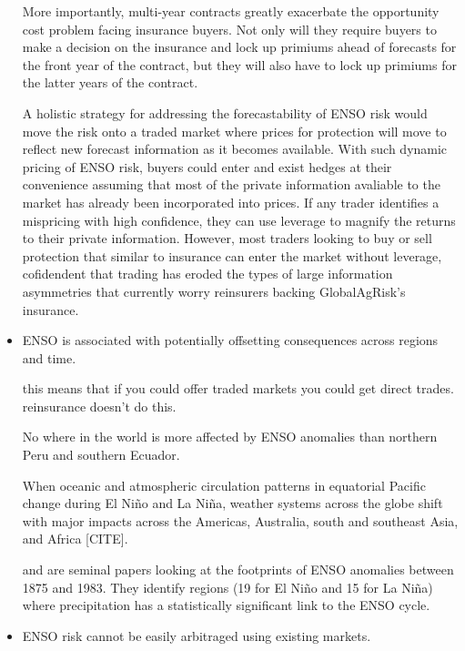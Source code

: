 \documentclass[authoryear]{article}
\begin{document}
\begin{itemize}
More importantly, multi-year contracts greatly exacerbate the opportunity cost problem facing insurance buyers. Not only will they require buyers to make a decision on the insurance and lock up primiums ahead of forecasts for the front year of the contract, but they will also have to lock up primiums for the latter years of the contract.

A holistic strategy for addressing the forecastability of ENSO risk would move the risk onto a traded market where prices for protection will move to reflect new forecast information as it becomes available. With such dynamic pricing of ENSO risk, buyers could enter and exist hedges at their convenience assuming that most of the private information avaliable to the market has already been incorporated into prices. If any trader identifies a mispricing with high confidence, they can use leverage to magnify the returns to their private information. However, most traders looking to buy or sell protection that similar to insurance can enter the market without leverage, cofidendent that trading has eroded the types of large information asymmetries that currently worry reinsurers backing GlobalAgRisk's insurance.


\item ENSO is associated with potentially offsetting consequences across regions and time. 

this means that if you could offer traded markets you could get direct trades. reinsurance doesn't do this. 

No where in the world is more affected by ENSO anomalies than northern Peru and southern Ecuador.

When oceanic and atmospheric circulation patterns in equatorial Pacific change during El Ni\~no and La Ni\~na, weather systems across the globe shift with major impacts across the Americas, Australia, south and southeast Asia, and Africa [CITE].

\citet{ropelewski1987global} and \citet{ropelewski1989precipitation} are seminal papers looking at the footprints of ENSO anomalies between 1875 and 1983. They identify regions (19 for El Ni\~no and 15 for La Ni\~na) where precipitation has a statistically significant link to the ENSO cycle.

\item ENSO risk cannot be easily arbitraged using existing markets.



\end{itemize}
\end{document}
